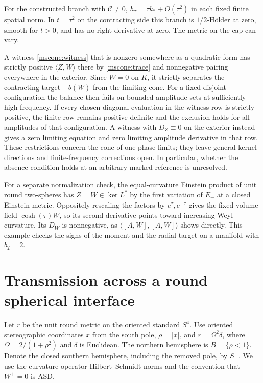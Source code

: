 \documentclass[11pt]{article}
\numberwithin{equation}{section}
\theoremstyle{definition}
\theoremstyle{remark}
\begin{document}
For the constructed branch with \(\mathcal C\ne0\),
\(h_\tau=\tau k_*+O(\tau^2)\) in each fixed finite spatial
norm. In \(t=\tau^2\) on the contracting side this branch is
\(1/2\)-H\"older at zero, smooth for \(t>0\), and has no right
derivative at zero. The metric on the cap can vary.

A witness \eqref{mscone:witness} that is nonzero somewhere as a
quadratic form has strictly positive \(\langle Z,W\rangle\) there
by \eqref{mscone:trace} and nonnegative pairing everywhere in the
exterior. Since \(W=0\) on \(K\), it strictly separates the
contracting target \(-b(W)\) from the limiting cone. For a fixed
disjoint configuration the balance then fails on bounded amplitude
sets at sufficiently high frequency. If every chosen diagonal
evaluation in the witness row is strictly positive, the finite
row remains positive definite and the exclusion holds for all
amplitudes of that configuration. A witness with \(D_Z\equiv0\) on
the exterior instead gives a zero limiting equation and zero
limiting amplitude derivative in that row. These restrictions
concern the cone of one-phase limits; they leave general kernel
directions and finite-frequency corrections open. In particular,
whether the absence condition holds at an arbitrary marked
reference is unresolved.

For a separate normalization check, the equal-curvature Einstein
product of unit round two-spheres has \(Z=W\in\ker L^*\)
by the first variation of \(E_+\) at a closed Einstein metric.
Oppositely rescaling the factors by \(e^\tau,e^{-\tau}\) gives the
fixed-volume field \(\cosh(\tau)W\), so its second derivative points
toward increasing Weyl curvature. Its \(D_W\) is nonnegative, as
\(\langle[A,W],[A,W]\rangle\) shows directly. This example checks
the signs of the moment and the radial target on a manifold with
\(b_2=2\).

\section{Transmission across a round spherical interface}\label{sec:transmission}

Let \(r\) be the unit round metric on the oriented standard \(S^4\).
Use oriented stereographic coordinates \(x\) from the south pole,
\(\rho=|x|\), and \(r=\Omega^2\delta\), where
\(\Omega=2/(1+\rho^2)\) and \(\delta\) is Euclidean. The northern
hemisphere is \(B=\{\rho<1\}\). Denote the closed southern hemisphere,
including the removed pole, by \(S_-\). We use the curvature-operator
Hilbert--Schmidt norms and the convention that \(W^+=0\) is ASD.
\end{document}
